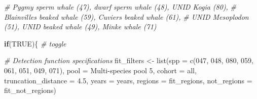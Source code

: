 \documentclass[
]{book}
\newenvironment{Shaded}{\begin{snugshade}}{\end{snugshade}}
\newcommand{\AttributeTok}[1]{\textcolor[rgb]{0.77,0.63,0.00}{#1}}
\newcommand{\CommentTok}[1]{\textcolor[rgb]{0.56,0.35,0.01}{\textit{#1}}}
\newcommand{\ConstantTok}[1]{\textcolor[rgb]{0.00,0.00,0.00}{#1}}
\newcommand{\ControlFlowTok}[1]{\textcolor[rgb]{0.13,0.29,0.53}{\textbf{#1}}}
\newcommand{\FloatTok}[1]{\textcolor[rgb]{0.00,0.00,0.81}{#1}}
\newcommand{\FunctionTok}[1]{\textcolor[rgb]{0.00,0.00,0.00}{#1}}
\newcommand{\NormalTok}[1]{#1}
\newcommand{\OtherTok}[1]{\textcolor[rgb]{0.56,0.35,0.01}{#1}}
\newcommand{\StringTok}[1]{\textcolor[rgb]{0.31,0.60,0.02}{#1}}
\begin{document}
\begin{Shaded}
\begin{Highlighting}[]
\CommentTok{\# Pygmy sperm whale (47), dwarf sperm whale (48), UNID Kogia (80),}
\CommentTok{\# Blainville\textquotesingle{}s beaked whale (59), Cuvier\textquotesingle{}s beaked whale (61),}
\CommentTok{\# UNID Mesoplodon (51), UNID beaked whale (49), Minke whale (71)}

\ControlFlowTok{if}\NormalTok{(}\ConstantTok{TRUE}\NormalTok{)\{ }\CommentTok{\# toggle}

  \CommentTok{\# Detection function specifications}
\NormalTok{  fit\_filters }\OtherTok{\textless{}{-}}
    \FunctionTok{list}\NormalTok{(}\AttributeTok{spp =} \FunctionTok{c}\NormalTok{(}\StringTok{\textquotesingle{}047\textquotesingle{}}\NormalTok{, }\StringTok{\textquotesingle{}048\textquotesingle{}}\NormalTok{, }\StringTok{\textquotesingle{}080\textquotesingle{}}\NormalTok{, }\StringTok{\textquotesingle{}059\textquotesingle{}}\NormalTok{, }\StringTok{\textquotesingle{}061\textquotesingle{}}\NormalTok{, }\StringTok{\textquotesingle{}051\textquotesingle{}}\NormalTok{, }\StringTok{\textquotesingle{}049\textquotesingle{}}\NormalTok{, }\StringTok{\textquotesingle{}071\textquotesingle{}}\NormalTok{),}
         \AttributeTok{pool =} \StringTok{\textquotesingle{}Multi{-}species pool 5\textquotesingle{}}\NormalTok{,}
         \AttributeTok{cohort =} \StringTok{\textquotesingle{}all\textquotesingle{}}\NormalTok{,}
         \AttributeTok{truncation\_distance =} \FloatTok{4.5}\NormalTok{,}
         \AttributeTok{years =}\NormalTok{ years,}
         \AttributeTok{regions =}\NormalTok{ fit\_regions,}
         \AttributeTok{not\_regions =}\NormalTok{ fit\_not\_regions)}


\end{Highlighting}
\end{Shaded}
\end{document}
